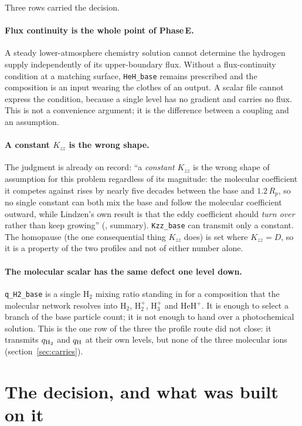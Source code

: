 \documentclass[english,a4paper]{my_memo}
\begin{document}
Three rows carried the decision.

\paragraph{Flux continuity is the whole point of Phase\,E.} A steady
lower-atmosphere chemistry solution cannot determine the hydrogen supply
independently of its upper-boundary flux. Without a flux-continuity
condition at a matching surface, \verb|HeH_base| remains prescribed and the
composition is an input wearing the clothes of an output. A scalar file
cannot express the condition, because a single level has no gradient and
carries no flux. This is not a convenience argument; it is the difference
between a coupling and an assumption.

\paragraph{A constant $K_{zz}$ is the wrong shape.} The judgment is already
on record: ``a \emph{constant} $K_{zz}$ is the wrong shape of assumption for
this problem regardless of its magnitude: the molecular coefficient it
competes against rises by nearly five decades between the base and
$1.2\,R_p$, so no single constant can both mix the base and follow the
molecular coefficient outward, while Lindzen's own result is that the eddy
coefficient should \emph{turn over} rather than keep growing''
(, summary). \verb|Kzz_base| can transmit
only a constant. The homopause (the one consequential thing $K_{zz}$
does) is set where $K_{zz} = D$, so it is a property of the two profiles
and not of either number alone.

\paragraph{The molecular scalar has the same defect one level down.}
\verb|q_H2_base| is a single H$_2$ mixing ratio standing in for a
composition that the molecular network resolves into H$_2$, H$_2^+$,
H$_3^+$ and HeH$^+$. It is enough to select a branch of the base particle
count; it is not enough to hand over a photochemical solution. This is the
one row of the three the profile route did not close: it transmits
$q_{\rm H_2}$ and $q_{\rm H}$ at their own levels, but none of the three
molecular ions (section~\ref{sec:carries}).

\section{The decision, and what was built on it}
\label{sec:decision}
\end{document}
